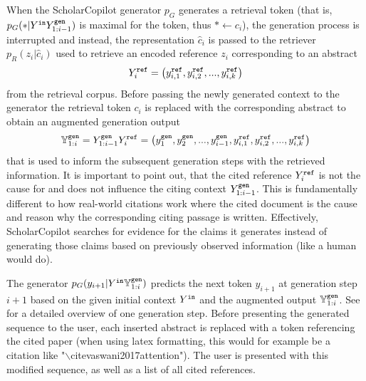 When the ScholarCopilot generator $p_G$ generates a retrieval token (that is, $p_G(\ast|Y^{\texttt{in}}Y^{\texttt{gen}}_{1:i-1})$ is maximal for the \mono{[RET]} token, thus $\ast\leftarrow c_i$), the generation process is interrupted and instead, the representation $\hat{c}_i$ is passed to the retriever $p_R(z_i|\hat{c}_i)$ used to retrieve an encoded reference $z_i$ corresponding to an abstract
\begin{align}\label{eq:abstract}
    Y^{\texttt{ref}}_i=\left({y^{\texttt{ref}}_{i,1},y^{\texttt{ref}}_{i,2},...,y^{\texttt{ref}}_{i,k}}\right)
\end{align}
from the retrieval corpus. Before passing the newly generated context to the generator the retrieval token $c_i$ is replaced with the corresponding abstract to obtain an augmented generation output
\begin{align}\label{eq:abstract-integration}
    \mathbb{Y}^{\texttt{gen}}_{1:i}=Y^{\texttt{gen}}_{1:i-1}Y^{\texttt{ref}}_{i}=\left({y^{\texttt{gen}}_{1},y^{\texttt{gen}}_{2},...,y^{\texttt{gen}}_{i-1},y^{\texttt{ref}}_{i,1},y^{\texttt{ref}}_{i,2},...,y^{\texttt{ref}}_{i,k}}\right)
\end{align}
that is used to inform the subsequent generation steps with the retrieved information. It is important to point out, that the cited reference $Y^{\texttt{ref}}_{i}$ is not the cause for and does not influence the citing context $Y^{\texttt{gen}}_{1:i-1}$. This is fundamentally different to how real-world citations work where the cited document is the cause and reason why the corresponding citing passage is written. Effectively, ScholarCopilot searches for evidence for the claims it generates instead of generating those claims based on previously observed information (like a human would do).

The generator $p_G(y_{i+1}|Y^{\texttt{in}}\mathbb{Y}^{\texttt{gen}}_{1:i})$ predicts the next token $y_{i+1}$ at generation step $i+1$ based on the given initial context $Y^{\texttt{in}}$ and the augmented output $\mathbb{Y}^{\texttt{gen}}_{1:i}$. See  for a detailed overview of one generation step. Before presenting the generated sequence to the user, each inserted abstract is replaced with a token referencing the cited paper (when using latex formatting, this would for example be a citation like "$\backslash$cite\mono{\{}vaswani2017attention\mono{\}}"). The user is presented with this modified sequence, as well as a list of all cited references.

